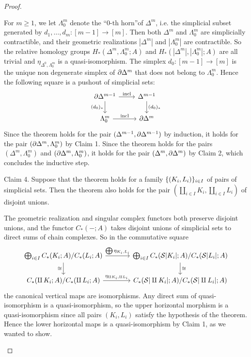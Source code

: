 \begin{proof}
\begin{claimproof}
For $m\ge1$, we let $\Lambda^m_0$ denote the \enquote{$0$-th horn}\alvaropls of $\Delta^m$, i.e. the simplicial subset generated by $d_1,\dots,d_m:[m-1]\to[m]$. Then both $\Delta^m$ and $\Lambda^m_0$ are simplicially contractible, and their geometric realizations $|\Delta^m|$ and $|\Lambda^m_0|$ are contractible. So the relative homology groups $H_*(\Delta^m,\Lambda^m_0;A)$ and $H_*(|\Delta^m|,|\Lambda^m_0|;A)$ are all trivial and $\eta_{\Delta^0,\Lambda^m_0}$ is a quasi-isomorphism. The simplex $d_0:[m-1]\to[m]$ is the unique non degenerate simplex of $\partial\Delta^m$ that does not belong to $\Lambda^m_0$. Hence the following square is a pushout of simplicial sets:
\[
\begin{tikzcd}
\de\Delta^{m-1} \ar[d,"(d_0)_*"'] \ar[r,"\incl"] & \Delta^{m-1} \ar[d,"(d_0)_*"]\\
\Lambda^m_0 \ar[r,"\incl"] & \de\Delta^m
\end{tikzcd}
\]
Since the theorem holds for the pair $(\Delta^{m-1},\partial\Delta^{m-1})$ by induction, it holds for the pair $(\partial\Delta^m,\Lambda^m_0)$ by Claim 1. Since the theorem holds for the pairs $(\Delta^m,\Lambda^m_0)$ and $(\partial\Delta^m,\Lambda^m_0)$, it holds for the pair $(\Delta^m,\partial\Delta^m)$ by Claim 2, which concludes the inductive step.
\end{claimproof}

Claim 4. Suppose that the theorem holds for a family $\{(K_i,L_i)\}_{i\in I}$ of pairs of simplicial sets. Then the theorem also holds for the pair $(\amalg_{i\in I}K_i,\amalg_{i\in I}L_i)$ of disjoint unions.

\begin{claimproof}
The geometric realization and singular complex functors both preserve disjoint unions, and the functor $C_*(-;A)$ takes disjoint unions of simplicial sets to direct sums of chain complexes. So in the commutative square
\[
\begin{tikzcd}[column sep=large]
\bigoplus_{i\in I} C_*(K_i;A)/C_*(L_i;A) \ar[d,"\cong"'] \ar[r,"\bigoplus\eta_{K_i,L_i}"] & \bigoplus_{i\in I} C_*(\S|K_i|;A)/C_*(\S|L_i|;A) \ar[d,"\cong"]\\
C_*(\amalg\,K_i;A)/C_*(\amalg\, L_i;A) \ar[r,"\eta_{\amalg K_i,\amalg L_i}"] & C_*(\S|\amalg K_i|;A)/C_*(\S|\amalg L_i|;A)
\end{tikzcd}
\]
the canonical vertical maps are isomorphisms. Any direct sum of quasi-isomorphism is a quasi-isomorphism, so the upper horizontal morphism is a quasi-isomorphism since all pairs $(K_i,L_i)$ satisfy the hypothesis of the theorem. Hence the lower horizontal maps is a quasi-isomorphism by Claim 1, as we wanted to show.
\end{claimproof}

\end{proof}
